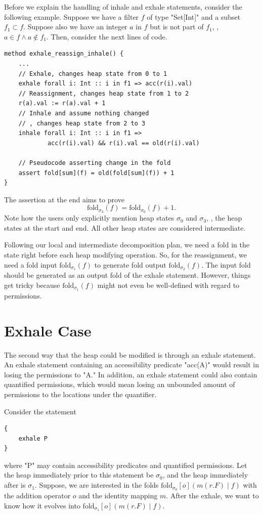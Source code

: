 \documentclass[msc,oneside]{ubcthesis}
\theoremstyle{definition}
\begin{document}
Before we explain the handling of inhale and exhale statements, consider the following example. Suppose we have a filter $f$ of type "Set[Int]" and a subset $f_1 \subset f$. Suppose also we have an integer $a$ in $f$ but is not part of $f_1$, \ie, $a \in f \land a \not\in f_1$. Then, consider the next lines of code.
\begin{lstlisting}
method exhale_reassign_inhale() {
    ...
    // Exhale, changes heap state from 0 to 1
    exhale forall i: Int :: i in f1 => acc(r(i).val)
    // Reassignment, changes heap state from 1 to 2
    r(a).val := r(a).val + 1
    // Inhale and assume nothing changed
    // , changes heap state from 2 to 3
    inhale forall i: Int :: i in f1 => 
            acc(r(i).val) && r(i).val == old(r(i).val)

    // Pseudocode asserting change in the fold
    assert fold[sum](f) = old(fold[sum](f)) + 1 
}
\end{lstlisting}
The assertion at the end aims to prove 
$$\textrm{fold}_{\sigma_{3}}(f) = \textrm{fold}_{\sigma_{0}}(f) + 1.$$ Note how the users only explicitly mention heap states $\sigma_{0}$ and $\sigma_{3}$, \ie, the heap states at the start and end. All other heap states are considered intermediate.

Following our local and intermediate decomposition plan, we need a fold in the state right before each heap modifying operation. So, for the reassignment, we need a fold input $\textrm{fold}_{\sigma_{1}}(f)$ to generate fold output $\textrm{fold}_{\sigma_{2}}(f)$. The input fold should be generated as an output fold of the exhale statement. However, things get tricky because $\textrm{fold}_{\sigma_{1}}(f)$ might not even be well-defined with regard to permissions. 

\section{Exhale Case}
The second way that the heap could be modified is through an exhale statement. An exhale statement containing an accessibility predicate "acc(A)" would result in losing the permissions to "A." In addition, an exhale statement could also contain quantified permissions, which would mean losing an unbounded amount of permissions to the locations under the quantifier. 

Consider the statement 
\begin{lstlisting}
{
    exhale P
}
\end{lstlisting}
where "P" may contain accessibility predicates and quantified permissions. Let the heap immediately prior to this statement be $\sigma_0$, and the heap immediately after is $\sigma_1$. Suppose, we are interested in the folds $\textrm{fold}_{\sigma_0}[o]( m(r.F) \mid f)$ with the addition operator $o$ and the identity mapping $m$. After the exhale, we want to know how it evolves into $\textrm{fold}_{\sigma_1}[o]( m(r.F) \mid f)$.
\end{document}
